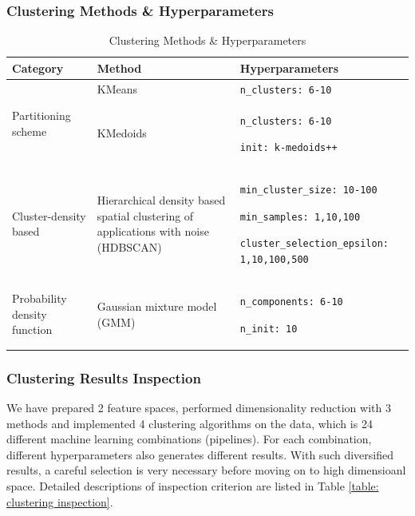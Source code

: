 \documentclass[a4paper]{article}
\begin{document}
\subsubsection{Clustering Methods \& Hyperparameters}

\begin{table}[h!]
    \centering
    \caption{Clustering Methods \& Hyperparameters}
    \begin{tabular}{p{}|p{}|p{}}
    \hline \hline
        \textbf{Category} & \textbf{Method} & \textbf{Hyperparameters} \\
        \hline
        \multirow{2}{.3\textwidth}{Partitioning scheme} & KMeans & \texttt{n\_clusters: 6-10} \\
        & KMedoids & \texttt{n\_clusters: 6-10} \par \texttt{init: k-medoids++} \\
        \hline
        Cluster-density based & Hierarchical density based spatial clustering of applications with noise (HDBSCAN) & \texttt{min\_cluster\_size: 10-100} \par \texttt{min\_samples: 1,10,100} \par \texttt{cluster\_selection\_epsilon: 1,10,100,500} \\
        \hline
        Probability density function & Gaussian mixture model (GMM) & \texttt{n\_components: 6-10} \par \texttt{n\_init: 10} \\
        \hline \hline
    \end{tabular}
    \label{table: clustering methods}
\end{table}

\subsubsection{Clustering Results Inspection}
We have prepared 2 feature spaces, performed dimensionality reduction with 3 methods and implemented 4 clustering algorithms on the data, which is 24 different machine learning combinations (pipelines). For each combination, different hyperparameters also generates different results. With such diversified results, a careful selection is very necessary before moving on to high dimensioanl space. Detailed descriptions of inspection criterion are listed in Table \ref{table: clustering inspection}.
\end{document}
